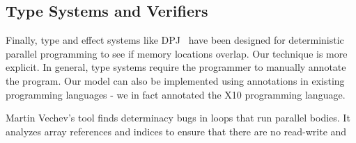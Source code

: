 \subsection{Type Systems and Verifiers} 
 
Finally, type and effect systems like DPJ~\cite{bocchino2009type} 
 have been designed for deterministic parallel programming to see if
memory locations overlap. Our technique is more explicit. 
In general, type systems require the programmer to manually annotate the program. Our model can also be implemented using annotations in existing
programming languages - we in fact annotated the X10 programming language.

Martin Vechev's tool \cite{vechev2011automatic}
finds determinacy bugs in loops that run parallel bodies. It analyzes
array references and indices to ensure that there are no read-write and 

